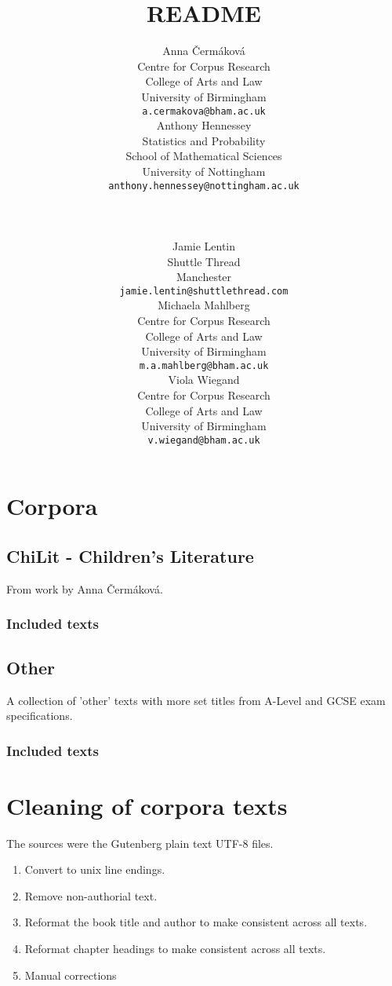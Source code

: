 \documentclass[a4paper,10pt]{paper}
\date{}
\author{
    \scriptsize
    \parbox{0.25\textwidth}{
       \small
       Anna Čermáková \\
       \scriptsize
       Centre for Corpus Research\\ College of Arts and Law\\ University of Birmingham\\
       \texttt{a.cermakova@bham.ac.uk}
    }
    \parbox{0.30\textwidth}{
        \small Anthony Hennessey \\
        \scriptsize
        Statistics and Probability\\ School of Mathematical Sciences\\ University of Nottingham \\
        \texttt{anthony.hennessey@nottingham.ac.uk}
    }
    \\ \\
    \parbox{0.30\textwidth}{
       \small
       Jamie Lentin \\
       \scriptsize
       Shuttle Thread\\ Manchester \\
       \texttt{jamie.lentin@shuttlethread.com}
    }
    \parbox{0.25\textwidth}{
       \small
       Michaela Mahlberg \\
       \scriptsize
       Centre for Corpus Research\\ College of Arts and Law\\ University of Birmingham \\
       \texttt{m.a.mahlberg@bham.ac.uk}
    }
    \parbox{0.25\textwidth}{
       \small
       Viola Wiegand \\
       \scriptsize
       Centre for Corpus Research\\ College of Arts and Law\\ University of Birmingham \\
       \texttt{v.wiegand@bham.ac.uk}
    }
}
\title{README}
\begin{document}
\nocite{*}

\maketitle

\tableofcontents

\section{Corpora}

\subsection{ChiLit - Children's Literature}
From work by Anna Čermáková.

\subsubsection{Included texts}
\printbibliography[heading=none,keyword=ChiLit]

\subsection{Other}
A collection of 'other' texts with more set titles from A-Level and GCSE exam specifications.

\subsubsection{Included texts}
\printbibliography[heading=none,keyword=Other]

\section{Cleaning of corpora texts} \label{se:cleaning}
The sources were the Gutenberg plain text UTF-8 files.

\begin{enumerate}
    \item \label{lst:line_endings} Convert to unix line endings.
    \item \label{lst:non_auth} Remove non-authorial text.
    \item \label{lst:title} Reformat the book title and author to make consistent across all texts. 
    \item \label{lst:chapters} Reformat chapter headings to make consistent across all texts. 
    \item \label{lst:manual} Manual corrections
\end{enumerate}
\end{document}
